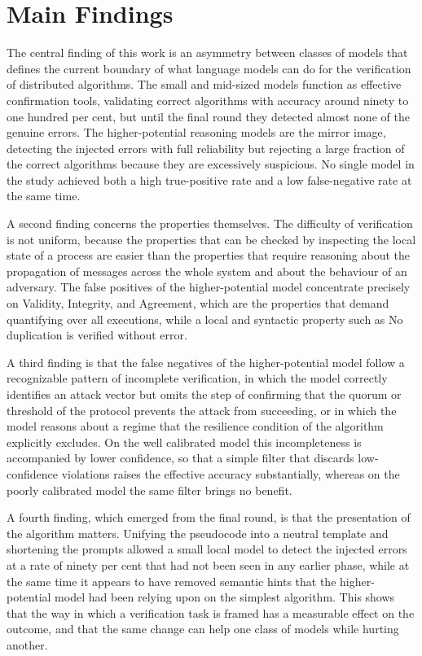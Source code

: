\section{Main Findings}

The central finding of this work is an asymmetry between classes of models that defines the current boundary of what language models can do for the verification of distributed algorithms. The small and mid-sized models function as effective confirmation tools, validating correct algorithms with accuracy around ninety to one hundred per cent, but until the final round they detected almost none of the genuine errors. The higher-potential reasoning models are the mirror image, detecting the injected errors with full reliability but rejecting a large fraction of the correct algorithms because they are excessively suspicious. No single model in the study achieved both a high true-positive rate and a low false-negative rate at the same time.

A second finding concerns the properties themselves. The difficulty of verification is not uniform, because the properties that can be checked by inspecting the local state of a process are easier than the properties that require reasoning about the propagation of messages across the whole system and about the behaviour of an adversary. The false positives of the higher-potential model concentrate precisely on Validity, Integrity, and Agreement, which are the properties that demand quantifying over all executions, while a local and syntactic property such as No duplication is verified without error.

A third finding is that the false negatives of the higher-potential model follow a recognizable pattern of incomplete verification, in which the model correctly identifies an attack vector but omits the step of confirming that the quorum or threshold of the protocol prevents the attack from succeeding, or in which the model reasons about a regime that the resilience condition of the algorithm explicitly excludes. On the well calibrated model this incompleteness is accompanied by lower confidence, so that a simple filter that discards low-confidence violations raises the effective accuracy substantially, whereas on the poorly calibrated model the same filter brings no benefit.

A fourth finding, which emerged from the final round, is that the presentation of the algorithm matters. Unifying the pseudocode into a neutral template and shortening the prompts allowed a small local model to detect the injected errors at a rate of ninety per cent that had not been seen in any earlier phase, while at the same time it appears to have removed semantic hints that the higher-potential model had been relying upon on the simplest algorithm. This shows that the way in which a verification task is framed has a measurable effect on the outcome, and that the same change can help one class of models while hurting another.

